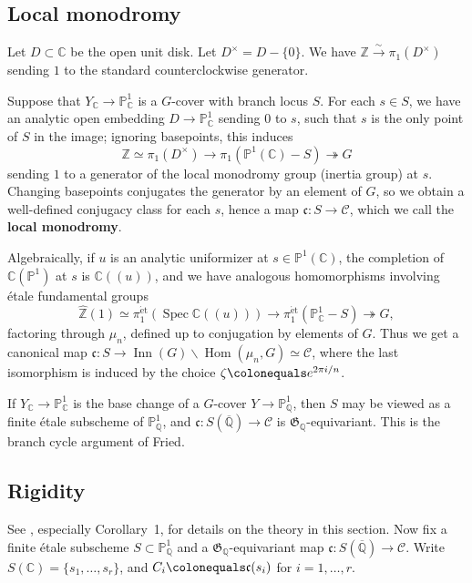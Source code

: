 \documentclass[12pt,reqno]{amsart}
\newcommand{\deficolor}{ForestGreen}
\newcommand{\defi}[1]{\textbf{\color{\deficolor} #1}} %
\newcommand{\C}{\mathbb{C}}
\newcommand{\PP}{\mathbb{P}}
\newcommand{\Q}{\mathbb{Q}}
\newcommand{\Z}{\mathbb{Z}}
\newcommand{\Qbar}{{\overline{\Q}}}
\newcommand{\Zhat}{{\hat{\Z}}}
\newcommand{\calC}{\mathcal{C}}
\newcommand{\cc}{\mathfrak{c}}
\newcommand{\GG}{\mathfrak{G}}
\DeclareMathOperator{\Hom}{Hom}
\DeclareMathOperator{\Inn}{Inn}
\DeclareMathOperator{\Spec}{Spec}
\newcommand{\isom}{\simeq}
\newcommand{\isomto}{\stackrel{\sim}\to}
\newcommand{\surjects}{\twoheadrightarrow}
\newcommand{\et}{\mathrm{\acute{e}t}}
\theoremstyle{definition}
\theoremstyle{remark}
\begin{document}
\subsection{Local monodromy}

Let $D \subset \C$ be the open unit disk.
Let $D^\times = D -\{0\}$.
We have $\Z \isomto \pi_1(D^\times)$ sending $1$ to the standard counterclockwise generator.

Suppose that $Y_\C \to \PP^1_\C$ is a $G$-cover with branch locus $S$.
For each $s \in S$, we have an analytic open embedding $D \to \PP^1_\C$ sending $0$ to $s$, 
such that $s$ is the only point of $S$ in the image;
ignoring basepoints, this induces 
\[
\Z \isom \pi_1(D^\times) \to \pi_1(\PP^1(\C)-S) \surjects G
\]
sending $1$ to a generator of the local monodromy group (inertia group) at $s$.
Changing basepoints conjugates the generator by an element of $G$,
so we obtain a well-defined conjugacy class for each $s$, hence a map $\cc \colon S \to \calC$, 
which we call the \defi{local monodromy}.

Algebraically, if $u$ is an analytic uniformizer at $s \in \PP^1(\C)$, 
the completion of $\C(\PP^1)$ at $s$ is $\C((u))$, and we have analogous homomorphisms involving \'etale fundamental groups
\[
\Zhat(1) \isom \pi_1^{\et}(\Spec \C((u))) \to \pi_1^{\et}(\PP^1_\C-S) \surjects G,
\]
factoring through $\mu_n$, defined up to conjugation by elements of $G$.
Thus we get a canonical map
$\cc \colon S \to \Inn(G) \backslash \Hom(\mu_n,G) \isom \calC$, where the last isomorphism is induced by the choice $\zeta \colonequals e^{2\pi i/n}$.

If $Y_\C \to \PP^1_\C$ is the base change of a $G$-cover $Y \to \PP^1_\Q$,
then $S$ may be viewed as a finite \'etale subscheme of $\PP^1_\Q$,
and $\cc \colon S(\Qbar) \to \calC$ is $\GG_\Q$-equivariant.
This is the branch cycle argument of Fried.

\subsection{Rigidity}
\label{S:rigidity}

See \cite{Fried-Voelklein1991}, especially Corollary~1, for details on the theory in this section.
Now fix a finite \'etale subscheme $S \subset \PP^1_\Q$ and a $\GG_\Q$-equivariant map $\cc \colon S(\Qbar) \to \calC$. 
Write $S(\C) = \{s_1,\ldots,s_r\}$, and $C_i \colonequals \cc(s_i)$ for $i=1,\ldots,r$.
\end{document}
